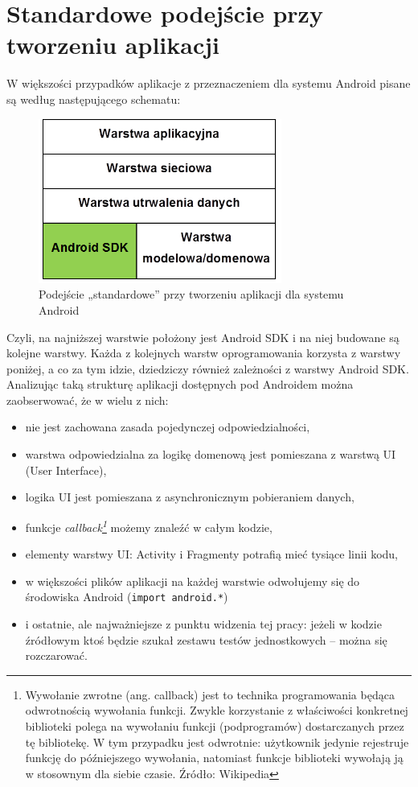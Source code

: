 \section{Standardowe podejście przy tworzeniu aplikacji}
W większości przypadków aplikacje z przeznaczeniem dla systemu Android pisane są według następującego schematu:

\begin{figure}[!htb]
    \centering
    \includegraphics[width=8cm]{imgs/ch3_opis_problemu_1.png}
    \caption
{Podejście „standardowe” przy tworzeniu aplikacji dla systemu Android}
    \label{fig:opis_problemu}
\end{figure} 

Czyli, na najniższej warstwie położony jest Android SDK i na niej budowane są kolejne warstwy. Każda z kolejnych warstw oprogramowania korzysta z warstwy poniżej, a co za tym idzie, dziedziczy również zależności z warstwy Android SDK. Analizując taką strukturę aplikacji dostępnych pod Androidem można zaobserwować, że w wielu z nich:
\begin{itemize}
\item
nie jest zachowana zasada pojedynczej odpowiedzialności,
\item
warstwa odpowiedzialna za logikę domenową jest pomieszana z warstwą UI (User Interface),
\item
logika UI jest pomieszana z asynchronicznym pobieraniem danych,
\item
funkcje \textit{callback\footnote{Wywołanie zwrotne (ang. callback) jest to technika programowania będąca odwrotnością wywołania funkcji. Zwykle korzystanie z właściwości konkretnej biblioteki polega na wywołaniu funkcji (podprogramów) dostarczanych przez tę bibliotekę. W tym przypadku jest odwrotnie: użytkownik jedynie rejestruje funkcję do późniejszego wywołania, natomiast funkcje biblioteki wywołają ją w stosownym dla siebie czasie. Źródło: Wikipedia}} możemy znaleźć w całym kodzie,
\item
elementy warstwy UI: Activity i Fragmenty potrafią mieć tysiące linii kodu,
\item
w większości plików aplikacji na każdej warstwie odwołujemy się do środowiska Android (\texttt{import android.*})
\item
i ostatnie, ale najważniejsze z punktu widzenia tej pracy: jeżeli w kodzie źródłowym ktoś będzie szukał zestawu testów jednostkowych – można się rozczarować.
\end{itemize}

